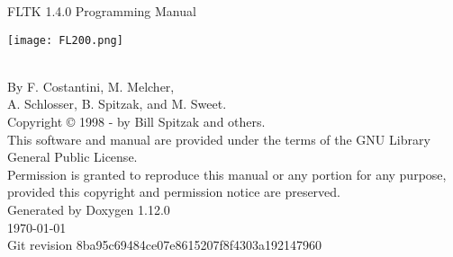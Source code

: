 %
%
\begin{titlepage}
\vspace*{5cm}
\begin{center}%
{\Huge FLTK 1.4.0 Programming Manual}\\
\vspace*{2cm}
\begin{DoxyImageNoCaption}
 \mbox{\texttt{[image: FL200.png]}}
\end{DoxyImageNoCaption}\\
\vspace*{2cm}
{\Large
By F. Costantini, M. Melcher, \\
A. Schlosser, B. Spitzak, and M. Sweet.}\\
\vspace*{1.5cm}
{\large Copyright © 1998 -  by Bill Spitzak and others.}\\
\vspace*{0.75cm}
{\small
This software and manual are provided under the terms of the GNU Library General Public License.}\\
{\small
Permission is granted to reproduce this manual or any portion for any purpose,}\\
{\small
provided this copyright and permission notice are preserved.}\\
\vspace*{1.5cm}
{\large Generated by Doxygen 1.12.0}\\
\vspace*{0.5cm}
\today{}\\
\vspace*{0.5cm}
{\small Git revision 8ba95c69484ce07e8615207f8f4303a192147960}\\
\end{center}
\end{titlepage}
%
%
